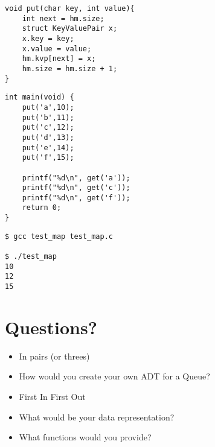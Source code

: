 \documentclass{beamer}
\begin{document}
\begin{frame}[fragile]
\begin{block}{}
\begin{lstlisting}
void put(char key, int value){
    int next = hm.size;
    struct KeyValuePair x;
    x.key = key;
    x.value = value;
    hm.kvp[next] = x;
    hm.size = hm.size + 1;
}
\end{lstlisting}
\end{block}
\end{frame}

\begin{frame}[fragile]
\begin{block}{}
\begin{lstlisting}
int main(void) {
	put('a',10);
	put('b',11);
	put('c',12);
	put('d',13);
	put('e',14);
	put('f',15);
	
	printf("%d\n", get('a'));
	printf("%d\n", get('c'));
	printf("%d\n", get('f'));
	return 0;
}
\end{lstlisting}
\end{block}
\end{frame}

\begin{frame}[fragile]
\begin{block}{}
\begin{lstlisting}
$ gcc test_map test_map.c 

$ ./test_map
10
12
15
\end{lstlisting}
\end{block}
\end{frame}

\section{Questions?}

\begin{frame}
\begin{itemize}
\item In pairs (or threes)
\item How would you create your own ADT for a Queue?
\item First In First Out
\bigskip
\item What would be your data representation?
\item What functions would you provide?
\end{itemize}
\end{frame}
\end{document}
